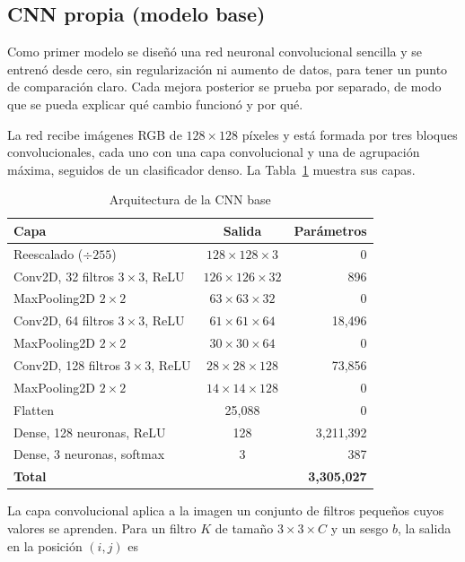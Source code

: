 \documentclass[letterpaper, 10 pt]{IEEEconf}
\begin{document}
\subsection{CNN propia (modelo base)}

Como primer modelo se diseñó una red neuronal convolucional sencilla y se entrenó desde cero, sin regularización ni aumento de datos, para tener un punto de comparación claro. Cada mejora posterior se prueba por separado, de modo que se pueda explicar qué cambio funcionó y por qué.

La red recibe imágenes RGB de $128 \times 128$ píxeles y está formada por tres bloques convolucionales, cada uno con una capa convolucional y una de agrupación máxima, seguidos de un clasificador denso. La Tabla~\ref{tab:cnn} muestra sus capas.

\begin{table}[H]
\caption{Arquitectura de la CNN base}
\label{tab:cnn}
\centering
\footnotesize
\begin{tabular}{lcr}
\hline
\textbf{Capa} & \textbf{Salida} & \textbf{Parámetros} \\
\hline
Reescalado ($\div 255$) & $128 \times 128 \times 3$ & 0 \\
Conv2D, 32 filtros $3 \times 3$, ReLU & $126 \times 126 \times 32$ & 896 \\
MaxPooling2D $2 \times 2$ & $63 \times 63 \times 32$ & 0 \\
Conv2D, 64 filtros $3 \times 3$, ReLU & $61 \times 61 \times 64$ & 18,496 \\
MaxPooling2D $2 \times 2$ & $30 \times 30 \times 64$ & 0 \\
Conv2D, 128 filtros $3 \times 3$, ReLU & $28 \times 28 \times 128$ & 73,856 \\
MaxPooling2D $2 \times 2$ & $14 \times 14 \times 128$ & 0 \\
Flatten & 25,088 & 0 \\
Dense, 128 neuronas, ReLU & 128 & 3,211,392 \\
Dense, 3 neuronas, softmax & 3 & 387 \\
\hline
\textbf{Total} & & \textbf{3,305,027} \\
\hline
\end{tabular}
\end{table}

La capa convolucional aplica a la imagen un conjunto de filtros pequeños cuyos valores se aprenden. Para un filtro $K$ de tamaño $3 \times 3 \times C$ y un sesgo $b$, la salida en la posición $(i,j)$ es
\end{document}
